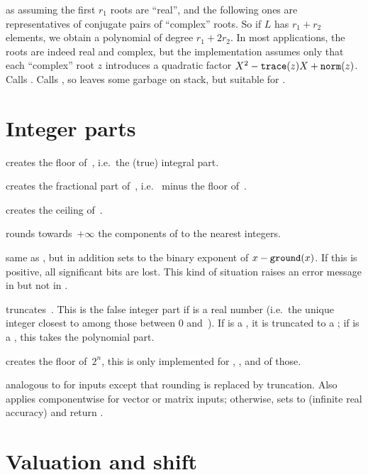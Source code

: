  as 
assuming the first $r_1$ roots are ``real'', and the following ones are
representatives of conjugate pairs of ``complex'' roots. So if $L$ has $r_1 +
r_2$ elements, we obtain a polynomial of degree $r_1 + 2r_2$. In most
applications, the roots are indeed real and complex, but the implementation
assumes only that each ``complex'' root $z$ introduces a quadratic
factor $X^2 - {\tt trace}(z) X + {\tt norm}(z)$. Calls
.
Calls , so leaves some garbage on stack, but
suitable for .

\section{Integer parts}

 creates the floor of~, i.e.\ the (true)
integral part.

 creates the fractional part of~, i.e.\ 
minus the floor of~.

 creates the ceiling of~.

 rounds towards~$+\infty$ the components of 
to the nearest integers.

 same as , but in addition sets
 to the binary exponent of $x - {\tt ground}(x)$. If this is
positive, all significant bits are lost. This kind of situation raises an
error message in  but not in .

 truncates~. This is the false integer part
if  is a real number (i.e.~the unique integer closest to  among
those between 0 and~). If  is a , it is truncated
to a ; if  is a , this takes the polynomial part.

 creates the floor of~$2^n$, this is
only implemented for , ,  and  of
those.

 analogous to  for
 inputs except that rounding is replaced by truncation. Also applies
componentwise for vector or matrix inputs; otherwise, sets  to
 (infinite real accuracy) and return .

\section{Valuation and shift}

